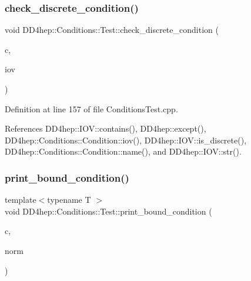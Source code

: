 \hypertarget{namespace_d_d4hep_1_1_conditions_1_1_test_a49378cef6a8e31974f1f44b1eaf39b3a}{}\label{namespace_d_d4hep_1_1_conditions_1_1_test_a49378cef6a8e31974f1f44b1eaf39b3a} 
\subsubsection{\texorpdfstring{check\+\_\+discrete\+\_\+condition()}{check\_discrete\_condition()}}
{\footnotesize\ttfamily void D\+D4hep\+::\+Conditions\+::\+Test\+::check\+\_\+discrete\+\_\+condition (\begin{DoxyParamCaption}\item[{\hyperlink{class_d_d4hep_1_1_conditions_1_1_condition}{Condition}}]{c,  }\item[{const \hyperlink{class_d_d4hep_1_1_i_o_v}{I\+OV} \&}]{iov }\end{DoxyParamCaption})}



Definition at line 157 of file Conditions\+Test.\+cpp.



References D\+D4hep\+::\+I\+O\+V\+::contains(), D\+D4hep\+::except(), D\+D4hep\+::\+Conditions\+::\+Condition\+::iov(), D\+D4hep\+::\+I\+O\+V\+::is\+\_\+discrete(), D\+D4hep\+::\+Conditions\+::\+Condition\+::name(), and D\+D4hep\+::\+I\+O\+V\+::str().

\hypertarget{namespace_d_d4hep_1_1_conditions_1_1_test_a584525f0624fb507254d78250d135d3d}{}\label{namespace_d_d4hep_1_1_conditions_1_1_test_a584525f0624fb507254d78250d135d3d} 
\subsubsection{\texorpdfstring{print\+\_\+bound\+\_\+condition()}{print\_bound\_condition()}}
{\footnotesize\ttfamily template$<$typename T $>$ \\
void D\+D4hep\+::\+Conditions\+::\+Test\+::print\+\_\+bound\+\_\+condition (\begin{DoxyParamCaption}\item[{\hyperlink{class_d_d4hep_1_1_conditions_1_1_condition}{Condition}}]{c,  }\item[{const char $\ast$}]{norm }\end{DoxyParamCaption})}



